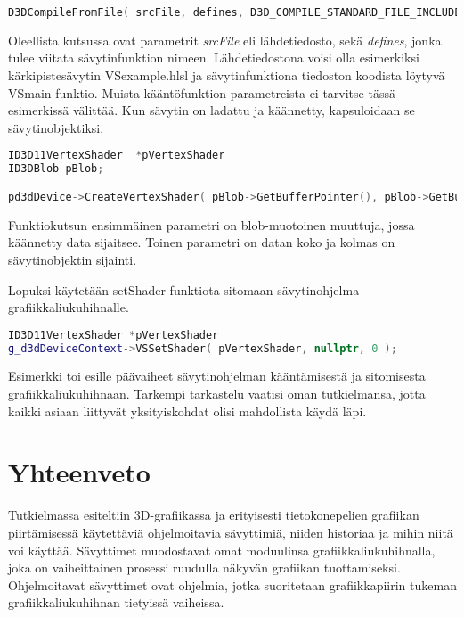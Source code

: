 \documentclass[finnish]{tktltiki2}
\theoremstyle{definition}
\theoremstyle{remark}
\begin{document}
\lstset{breaklines=true}
\begin{lstlisting}[language=c++, basicstyle = \small]
D3DCompileFromFile( srcFile, defines, D3D_COMPILE_STANDARD_FILE_INCLUDE, entryPoint, profile, flags, 0, &shaderBlob, &errorBlob );
\end{lstlisting}

Oleellista kutsussa ovat parametrit \emph{srcFile} eli lähdetiedosto, sekä \emph{defines}, jonka tulee viitata sävytinfunktion nimeen. Lähdetiedostona voisi olla esimerkiksi kärkipistesävytin VSexample.hlsl ja sävytinfunktiona tiedoston koodista löytyvä VSmain-funktio. Muista kääntöfunktion parametreista ei tarvitse tässä esimerkissä välittää. Kun sävytin on ladattu ja käännetty, kapsuloidaan se sävytinobjektiksi.

\lstset{breaklines=true}
\begin{lstlisting}[language=c++, basicstyle = \footnotesize]
ID3D11VertexShader  *pVertexShader
ID3DBlob pBlob;

pd3dDevice->CreateVertexShader( pBlob->GetBufferPointer(), pBlob->GetBufferSize(), &pVertexShader );

\end{lstlisting}

Funktiokutsun ensimmäinen parametri on blob-muotoinen muuttuja, jossa käännetty data sijaitsee. Toinen parametri on datan koko ja kolmas on sävytinobjektin sijainti.

Lopuksi käytetään setShader-funktiota sitomaan sävytinohjelma grafiikkaliukuhihnalle.

\lstset{breaklines=true}
\begin{lstlisting}[language=c++, basicstyle = \footnotesize]
ID3D11VertexShader *pVertexShader
g_d3dDeviceContext->VSSetShader( pVertexShader, nullptr, 0 );
\end{lstlisting}

Esimerkki toi esille päävaiheet sävytinohjelman kääntämisestä ja sitomisesta grafiikkaliukuhihnaan. Tarkempi tarkastelu vaatisi oman tutkielmansa, jotta kaikki asiaan liittyvät yksityiskohdat olisi mahdollista käydä läpi.

\section{Yhteenveto}

Tutkielmassa esiteltiin 3D-grafiikassa ja erityisesti tietokonepelien grafiikan piirtämisessä käytettäviä ohjelmoitavia sävyttimiä, niiden historiaa ja mihin niitä voi käyttää. Sävyttimet muodostavat omat moduulinsa grafiikkaliukuhihnalla, joka on vaiheittainen prosessi ruudulla näkyvän grafiikan tuottamiseksi. Ohjelmoitavat sävyttimet ovat ohjelmia, jotka suoritetaan grafiikkapiirin tukeman grafiikkaliukuhihnan tietyissä vaiheissa.
\end{document}

